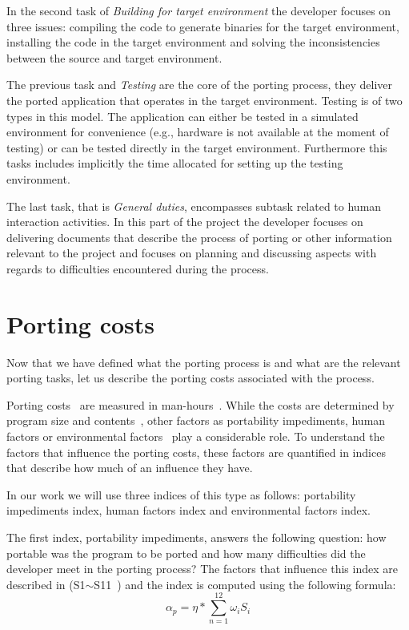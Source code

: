 In the second task of \textit{Building for target environment} the developer
focuses on three issues: compiling the code to generate binaries for the
target environment, installing the code in the target environment and solving
the inconsistencies between the source and target environment.

The previous task and \textit{Testing} are the core of the porting process, they
deliver the ported application that operates in the target environment.
Testing is of two types in this model. The application can either be tested in a
simulated environment for convenience (e.g., hardware is not available at the
moment of testing) or can be tested directly in the target environment.
Furthermore this tasks includes implicitly the time allocated for setting up the
testing environment.

The last task, that is \textit{General duties}, encompasses subtask related to
human interaction activities. In this part of the project the developer focuses
on delivering documents that describe the process of porting or other
information relevant to the project and focuses on planning and discussing
aspects with regards to difficulties encountered during the process.

\section{Porting costs}

Now that we have defined what the porting process is and what are the relevant
porting tasks, let us describe the porting costs associated with the process.~

Porting costs~ are measured in man-hours~\cite{tanaka, hakuta}. While the costs are
determined by program size and contents~\cite{hakuta}, other factors as portability
impediments, human factors or environmental factors~\cite{hakuta} play a
considerable role. To understand the factors that influence the porting costs,
these factors are quantified in indices that describe how much of an influence
they have.

In our work we will use three indices of this type as follows: portability
impediments index, human factors index and environmental factors index.

The first index, portability impediments, answers the following question: how
portable was the program to be ported and how many difficulties did the
developer meet in the porting process? The factors that influence this index are
described in (S1$\sim$S11~\cite{hakuta}) and the index is computed using the
following formula: \[ \alpha_p = \eta * \sum_{n=1}^{12} \omega_i S_i \]

